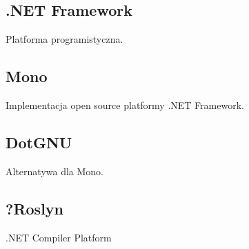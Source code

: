\subsection{.NET Framework}
Platforma programistyczna.

\subsection{Mono}
Implementacja open source platformy .NET Framework.

\subsection{DotGNU}
Alternatywa dla Mono.

\subsection{?Roslyn}
.NET Compiler Platform


